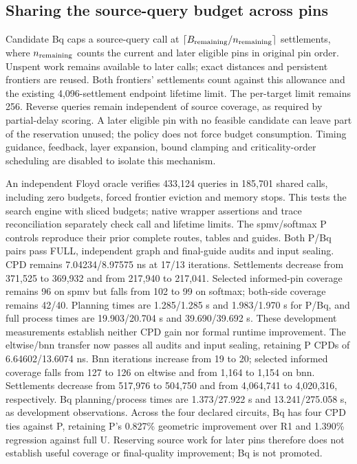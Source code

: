 \documentclass[conference,10pt]{IEEEtran}
\begin{document}
\subsection{Sharing the source-query budget across pins}
Candidate Bq caps a source-query call at $\lceil B_{\rm remaining}/n_{\rm remaining}\rceil$ settlements, where $n_{\rm remaining}$ counts the current and later eligible pins in original pin order. Unspent work remains available to later calls; exact distances and persistent frontiers are reused. Both frontiers' settlements count against this allowance and the existing 4,096-settlement endpoint lifetime limit. The per-target limit remains 256. Reverse queries remain independent of source coverage, as required by partial-delay scoring. A later eligible pin with no feasible candidate can leave part of the reservation unused; the policy does not force budget consumption. Timing guidance, feedback, layer expansion, bound clamping and criticality-order scheduling are disabled to isolate this mechanism.

An independent Floyd oracle verifies 433,124 queries in 185,701 shared calls, including zero budgets, forced frontier eviction and memory stops. This tests the search engine with sliced budgets; native wrapper assertions and trace reconciliation separately check call and lifetime limits. The spmv/softmax P controls reproduce their prior complete routes, tables and guides. Both P/Bq pairs pass FULL, independent graph and final-guide audits and input sealing. CPD remains 7.04234/8.97575 ns at 17/13 iterations. Settlements decrease from 371,525 to 369,932 and from 217,940 to 217,041. Selected informed-pin coverage remains 96 on spmv but falls from 102 to 99 on softmax; both-side coverage remains 42/40. Planning times are 1.285/1.285 s and 1.983/1.970 s for P/Bq, and full process times are 19.903/20.704 s and 39.690/39.692 s. These development measurements establish neither CPD gain nor formal runtime improvement. The eltwise/bnn transfer now passes all audits and input sealing, retaining P CPDs of 6.64602/13.6074 ns. Bnn iterations increase from 19 to 20; selected informed coverage falls from 127 to 126 on eltwise and from 1,164 to 1,154 on bnn. Settlements decrease from 517,976 to 504,750 and from 4,064,741 to 4,020,316, respectively. Bq planning/process times are 1.373/27.922 s and 13.241/275.058 s, as development observations. Across the four declared circuits, Bq has four CPD ties against P, retaining P's 0.827\% geometric improvement over R1 and 1.390\% regression against full U. Reserving source work for later pins therefore does not establish useful coverage or final-quality improvement; Bq is not promoted.
\end{document}
